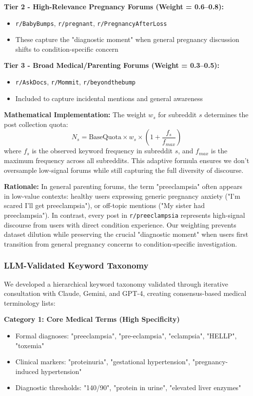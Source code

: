 \documentclass[12pt, a4paper]{article}
\begin{document}
\textbf{Tier 2 - High-Relevance Pregnancy Forums (Weight = 0.6--0.8):}
\begin{itemize}
    \item \texttt{r/BabyBumps}, \texttt{r/pregnant}, \texttt{r/PregnancyAfterLoss}
    \item These capture the "diagnostic moment" when general pregnancy discussion shifts to condition-specific concern
\end{itemize}

\textbf{Tier 3 - Broad Medical/Parenting Forums (Weight = 0.3--0.5):}
\begin{itemize}
    \item \texttt{r/AskDocs}, \texttt{r/Mommit}, \texttt{r/beyondthebump}
    \item Included to capture incidental mentions and general awareness
\end{itemize}

\textbf{Mathematical Implementation:}
The weight $w_s$ for subreddit $s$ determines the post collection quota:
\begin{equation}
    N_s = \text{BaseQuota} \times w_s \times \left(1 + \frac{f_s}{f_{max}}\right)
\end{equation}
where $f_s$ is the observed keyword frequency in subreddit $s$, and $f_{max}$ is the maximum frequency across all subreddits. This adaptive formula ensures we don't oversample low-signal forums while still capturing the full diversity of discourse.

\textbf{Rationale:} In general parenting forums, the term "preeclampsia" often appears in low-value contexts: healthy users expressing generic pregnancy anxiety ("I'm scared I'll get preeclampsia"), or off-topic mentions ("My sister had preeclampsia"). In contrast, every post in \texttt{r/preeclampsia} represents high-signal discourse from users with direct condition experience. Our weighting prevents dataset dilution while preserving the crucial "diagnostic moment" when users first transition from general pregnancy concerns to condition-specific investigation.

\subsubsection{LLM-Validated Keyword Taxonomy}
We developed a hierarchical keyword taxonomy validated through iterative consultation with Claude, Gemini, and GPT-4, creating consensus-based medical terminology lists:

\textbf{Category 1: Core Medical Terms (High Specificity)}
\begin{itemize}
    \item Formal diagnoses: "preeclampsia", "pre-eclampsia", "eclampsia", "HELLP", "toxemia"
    \item Clinical markers: "proteinuria", "gestational hypertension", "pregnancy-induced hypertension"
    \item Diagnostic thresholds: "140/90", "protein in urine", "elevated liver enzymes"
\end{itemize}
\end{document}
